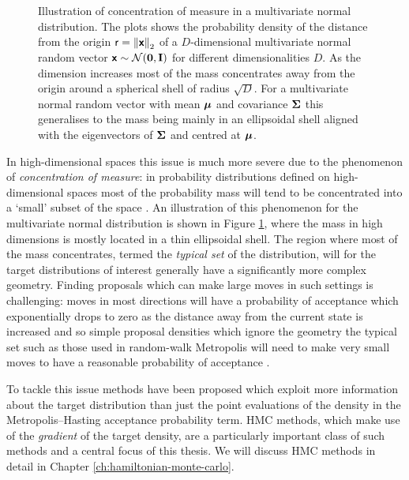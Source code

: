 \begin{figure}[!t]
\centering
{}
\caption[Concentration of measure in high dimensions.]{Illustration of concentration of measure in a multivariate normal distribution. The plots shows the probability density of the distance from the origin $\rvar{r} = \left\Vert\rvct{x}\right\Vert_2$ of a $D$-dimensional multivariate normal random vector $\rvct{x} \sim \nrm{\vct{0},\mathbf{I}}$ for different dimensionalities $D$. As the dimension increases most of the mass concentrates away from the origin around a spherical shell of radius $\sqrt{D}$. For a multivariate normal random vector with mean $\boldsymbol{\mu}$ and covariance $\boldsymbol{\Sigma}$ this generalises to the mass being mainly in an ellipsoidal shell aligned with the eigenvectors of $\boldsymbol{\Sigma}$ and centred at $\boldsymbol{\mu}$.}
\label{fig:concentration-of-measure-gaussian}
\end{figure}

In high-dimensional spaces this issue is much more severe due to the phenomenon of \emph{concentration of measure}: in probability distributions defined on high-dimensional spaces most of the probability mass will tend to be concentrated into a `small' subset of the space \citep{mackay2003information,barp2017geometry}. An illustration of this phenomenon for the multivariate normal distribution is shown in Figure \ref{fig:concentration-of-measure-gaussian}, where the mass in high dimensions is mostly located in a thin ellipsoidal shell. The region where most of the mass concentrates, termed the \emph{typical set} of the distribution, will for the target distributions of interest generally have a significantly more complex geometry. Finding proposals which can make large moves in such settings is challenging: moves in most directions will have a probability of acceptance which exponentially drops to zero as the distance away from the current state is increased and so simple proposal densities which ignore the geometry the typical set such as those used in random-walk Metropolis will need to make very small moves to have a reasonable probability of acceptance \cite{betancourt2017conceptual}.

To tackle this issue methods have been proposed which exploit more information about the target distribution than just the point evaluations of the density in the Metropolis--Hasting acceptance probability term. \ac{HMC} methods, which make use of the \emph{gradient} of the target density, are a particularly important class of such methods and a central focus of this thesis. We will discuss \ac{HMC} methods in detail in Chapter \ref{ch:hamiltonian-monte-carlo}.

